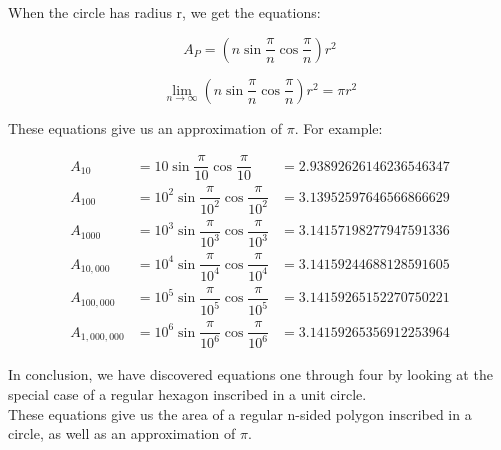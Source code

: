 \documentclass{article}
\begin{document}
When the circle has radius r, we get the equations:

\begin{equation}
A_{P} = \left( n \sin \dfrac{\pi}{n} \cos \dfrac{\pi}{n} \right) r^2
\end{equation}

\begin{equation}
\lim_{n \to \infty} \left( n \sin \dfrac{\pi}{n} \cos \dfrac{\pi}{n} \right) r^2 = \pi r^2
\end{equation}

These equations give us an approximation of $\pi$. For example:

\begin{align*}
A_{10} &= 10 \sin \dfrac{\pi}{10} \cos \dfrac{\pi}{10} &= 2.93892626146236546347 \\
A_{100} &= 10^2 \sin \dfrac{\pi}{10^2} \cos \dfrac{\pi}{10^2} &= 3.13952597646566866629 \\
A_{1000} &= 10^3 \sin \dfrac{\pi}{10^3} \cos \dfrac{\pi}{10^3} &= 3.14157198277947591336 \\
A_{10,000} &= 10^4 \sin \dfrac{\pi}{10^4} \cos \dfrac{\pi}{10^4} &= 3.14159244688128591605 \\
A_{100,000} &= 10^5 \sin \dfrac{\pi}{10^5} \cos \dfrac{\pi}{10^5} &= 3.14159265152270750221 \\
A_{1,000,000} &= 10^6 \sin \dfrac{\pi}{10^6} \cos \dfrac{\pi}{10^6} &= 3.14159265356912253964
\end{align*}

In conclusion, we have discovered equations one through four by looking at the special case of a regular hexagon inscribed in a unit circle. \\

These equations give us the area of a regular n-sided polygon inscribed in a circle, as well as an approximation of $\pi$.
\end{document}
